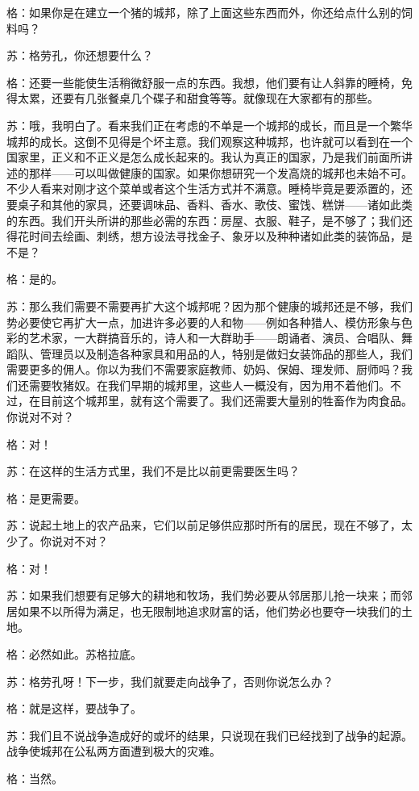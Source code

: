 \documentclass[12pt,oneside]{book}
\begin{document}
格：如果你是在建立一个猪的城邦，除了上面这些东西而外，你还给点什么别的饲料吗？

苏：格劳孔，你还想要什么？

格：还要一些能使生活稍微舒服一点的东西。我想，他们要有让人斜靠的睡椅，免得太累，还要有几张餐桌几个碟子和甜食等等。就像现在大家都有的那些。

苏：哦，我明白了。看来我们正在考虑的不单是一个城邦的成长，而且是一个繁华城邦的成长。这倒不见得是个坏主意。我们观察这种城邦，也许就可以看到在一个国家里，正义和不正义是怎么成长起来的。我认为真正的国家，乃是我们前面所讲述的那样——可以叫做健康的国家。如果你想研究一个发高烧的城邦也未始不可。不少人看来对刚才这个菜单或者这个生活方式并不满意。睡椅毕竟是要添置的，还要桌子和其他的家具，还要调味品、香料、香水、歌伎、蜜饯、糕饼——诸如此类的东西。我们开头所讲的那些必需的东西：房屋、衣服、鞋子，是不够了；我们还得花时间去绘画、刺绣，想方设法寻找金子、象牙以及种种诸如此类的装饰品，是不是？

格：是的。

苏：那么我们需要不需要再扩大这个城邦呢？因为那个健康的城邦还是不够，我们势必要使它再扩大一点，加进许多必要的人和物——例如各种猎人、模仿形象与色彩的艺术家，一大群搞音乐的，诗人和一大群助手——朗诵者、演员、合唱队、舞蹈队、管理员以及制造各种家具和用品的人，特别是做妇女装饰品的那些人，我们需要更多的佣人。你以为我们不需要家庭教师、奶妈、保姆、理发师、厨师吗？我们还需要牧猪奴。在我们早期的城邦里，这些人一概没有，因为用不着他们。不过，在目前这个城邦里，就有这个需要了。我们还需要大量别的牲畜作为肉食品。你说对不对？

格：对！

苏：在这样的生活方式里，我们不是比以前更需要医生吗？

格：是更需要。

苏：说起土地上的农产品来，它们以前足够供应那时所有的居民，现在不够了，太少了。你说对不对？

格：对！

苏：如果我们想要有足够大的耕地和牧场，我们势必要从邻居那儿抢一块来；而邻居如果不以所得为满足，也无限制地追求财富的话，他们势必也要夺一块我们的土地。

格：必然如此。苏格拉底。

苏：格劳孔呀！下一步，我们就要走向战争了，否则你说怎么办？

格：就是这样，要战争了。

苏：我们且不说战争造成好的或坏的结果，只说现在我们已经找到了战争的起源。战争使城邦在公私两方面遭到极大的灾难。

格：当然。
\end{document}
